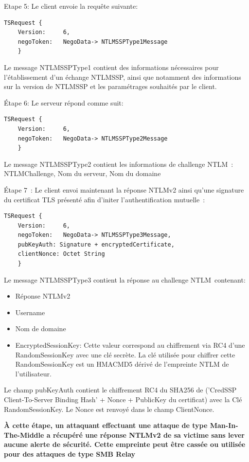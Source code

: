 Etape 5: Le client envoie la requête suivante:

\begin{lstlisting}[frame=single,basicstyle=\tiny]
TSRequest {
	Version:     6,
	negoToken:   NegoData-> NTLMSSPType1Message
	}
\end{lstlisting}

Le message NTLMSSPType1 contient des informations n\'ecessaires pour l’établissement d’un échange NTLMSSP, ainsi que notamment des informations sur la version de NTLMSSP et les paramétrages souhaités par le client.

Étape 6: Le serveur r\'epond comme suit:

\begin{lstlisting}[frame=single,basicstyle=\tiny]
TSRequest {
	Version:     6,
	negoToken:   NegoData-> NTLMSSPType2Message
	}
\end{lstlisting}


Le message NTLMSSPType2 contient les informations de challenge NTLM : NTLMChallenge, Nom du serveur, Nom du domaine

Étape 7 :
Le client envoi maintenant la r\'eponse NTLMv2 ainsi qu'une signature du certificat TLS présenté afin d'initer l'authentification mutuelle :

\begin{lstlisting}[frame=single,basicstyle=\tiny]
TSRequest {
	Version:     6,
	negoToken:   NegoData-> NTLMSSPType3Message,
	pubKeyAuth: Signature + encryptedCertificate,
	clientNonce: Octet String
	}
\end{lstlisting}

Le message NTLMSSPType3 contient la r\'eponse au challenge NTLM contenant:
\begin{itemize}
	\item R\'eponse NTLMv2
	\item Username
	\item Nom de domaine
	\item EncryptedSessionKey: Cette valeur correspond au chiffrement via RC4 d’une RandomSessionKey avec une cl\'e secrète. La clé utilisée pour chiffrer cette RandomSessionKey est un HMACMD5 dérivé de l'empreinte NTLM de l’utilisateur.
\end{itemize}
Le champ pubKeyAuth contient le chiffrement RC4 du SHA256 de (’CredSSP Client-To-Server Binding Hash’ + Nonce + PublicKey du certificat) avec la Cl\'e RandomSessionKey.
Le Nonce est renvoy\'e dans le champ ClientNonce.

\textbf{À cette \'etape, un attaquant effectuant une attaque de type Man-In-The-Middle a récupéré une réponse NTLMv2 de sa victime sans lever aucune alerte de sécurité. Cette empreinte peut être cassée ou utilisée pour des attaques de type SMB Relay}

